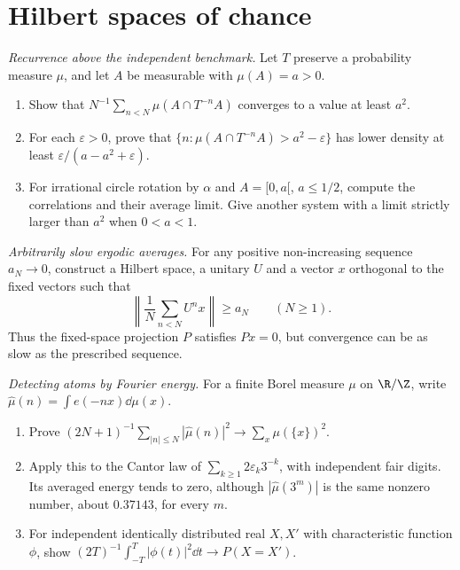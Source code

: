 \section{Hilbert spaces of chance}
\begin{exercise}[$\star\star$]\label{pb:khinchinrec}
\emph{Recurrence above the independent benchmark.} Let $T$ preserve a probability measure $\mu$, and let $A$ be measurable with $\mu(A)=a>0$.
\begin{enumerate}[label=(\alph*)]
\item Show that $N^{-1}\sum_{n<N}\mu(A\cap T^{-n}A)$ converges to a value at least $a^2$.
\item For each $\varepsilon>0$, prove that $\{n:\mu(A\cap T^{-n}A)>a^2-\varepsilon\}$ has lower density at least $\varepsilon/(a-a^2+\varepsilon)$.
\item For irrational circle rotation by $\alpha$ and $A=[0,a[$, $a\le1/2$, compute the correlations and their average limit. Give another system with a limit strictly larger than $a^2$ when $0<a<1$.
\end{enumerate}
\end{exercise}
\begin{exercise}[$\star\star$]\label{pb:norate}
\emph{Arbitrarily slow ergodic averages.} For any positive non-increasing sequence $a_N\to0$, construct a Hilbert space, a unitary $U$ and a vector $x$ orthogonal to the fixed vectors such that
\[\left\|\frac1N\sum_{n<N}U^nx\right\|\ge a_N\qquad(N\ge1).\]
Thus the fixed-space projection $P$ satisfies $Px=0$, but convergence can be as slow as the prescribed sequence.
\end{exercise}
\begin{exercise}[$\star\star$]\label{pb:wiener}
\emph{Detecting atoms by Fourier energy.} For a finite Borel measure $\mu$ on $\R/\Z$, write $\hat\mu(n)=\int e(-nx)\dd\mu(x)$.
\begin{enumerate}[label=(\alph*)]
\item Prove $(2N+1)^{-1}\sum_{|n|\le N}|\hat\mu(n)|^2\to\sum_x\mu(\{x\})^2$.
\item Apply this to the Cantor law of $\sum_{k\ge1}2\varepsilon_k3^{-k}$, with independent fair digits. Its averaged energy tends to zero, although $|\hat\mu(3^m)|$ is the same nonzero number, about $0.37143$, for every $m$.
\item For independent identically distributed real $X,X'$ with characteristic function $\phi$, show $(2T)^{-1}\int_{-T}^T|\phi(t)|^2\dd t\to P(X=X')$.
\end{enumerate}
\end{exercise}
